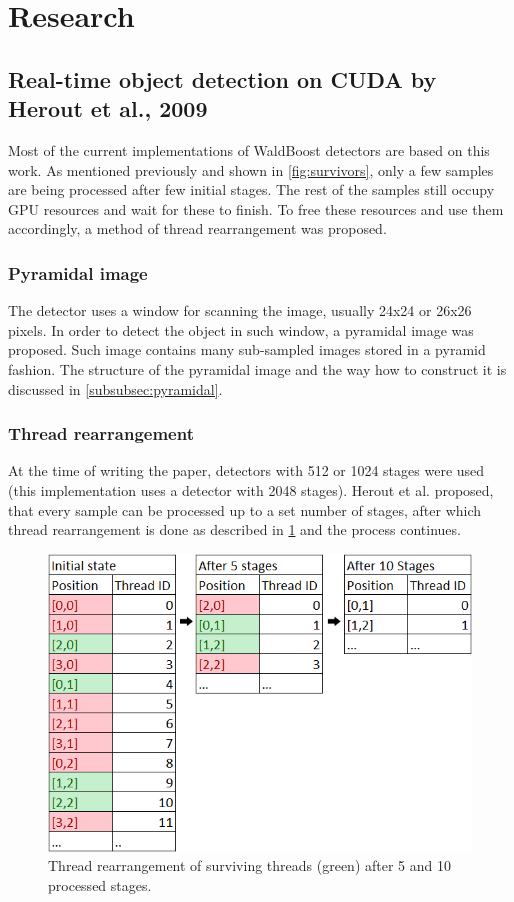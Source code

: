 \section{Research}

\subsection{Real-time object detection on CUDA by Herout et al., 2009}

Most of the current implementations of WaldBoost detectors are based on this work. As mentioned previously and shown in \ref{fig:survivors}, only a few samples are being processed after few initial stages. The rest of the samples still occupy GPU resources and wait for these to finish. To free these resources and use them accordingly, a method of thread rearrangement was proposed.

\subsubsection{Pyramidal image}

The detector uses a window for scanning the image, usually 24x24 or 26x26 pixels. In order to detect the object in such window, a pyramidal image was proposed. Such image contains many sub-sampled images stored in a pyramid fashion. The structure of the pyramidal image and the way how to construct it is discussed in \ref{subsubsec:pyramidal}.

\subsubsection{Thread rearrangement}

At the time of writing the paper, detectors with 512 or 1024 stages were used (this implementation uses a detector with 2048 stages). Herout et al. proposed, that every sample can be processed up to a set number of stages, after which thread rearrangement is done as described in \ref{fig:thread-rearrangement} and the process continues.

\begin{center}
\begin{figure}[h]
	\centering\includegraphics[width=0.6\linewidth]{fig/threadrear.png}
	\caption{Thread rearrangement of surviving threads (green) after 5 and 10 processed stages.}
	\label{fig:thread-rearrangement}
\end{figure}
\end{center}

